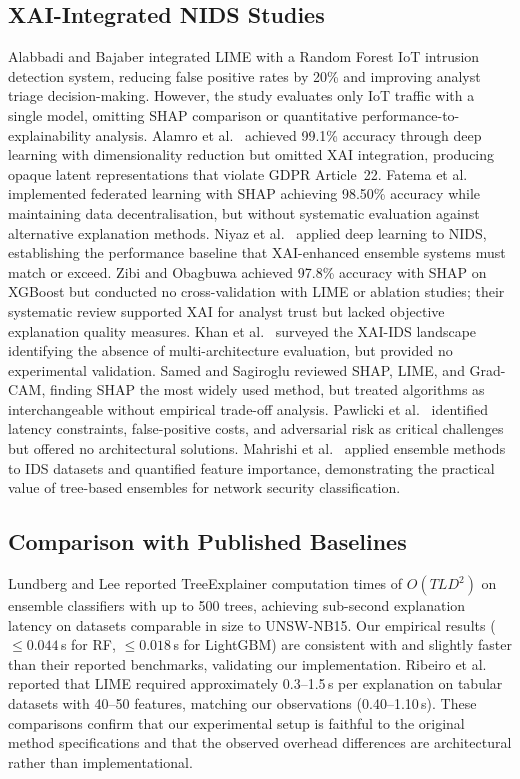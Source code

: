 \documentclass[conference]{IEEEtran}
\begin{document}
\subsection{XAI-Integrated NIDS Studies}

Alabbadi and Bajaber \cite{alabbadi2025} integrated LIME with a Random Forest IoT intrusion detection system, reducing false positive rates by 20\% and improving analyst triage decision-making. However, the study evaluates only IoT traffic with a single model, omitting SHAP comparison or quantitative performance-to-explainability analysis. Alamro et al.\ \cite{alamro2025} achieved 99.1\% accuracy through deep learning with dimensionality reduction but omitted XAI integration, producing opaque latent representations that violate GDPR Article~22. Fatema et al.\ \cite{fatema2025} implemented federated learning with SHAP achieving 98.50\% accuracy while maintaining data decentralisation, but without systematic evaluation against alternative explanation methods. Niyaz et al.\ \cite{niyaz2016} applied deep learning to NIDS, establishing the performance baseline that XAI-enhanced ensemble systems must match or exceed. Zibi and Obagbuwa \cite{zibi2025b} achieved 97.8\% accuracy with SHAP on XGBoost but conducted no cross-validation with LIME or ablation studies; their systematic review \cite{zibi2025a} supported XAI for analyst trust but lacked objective explanation quality measures. Khan et al.\ \cite{khan2025} surveyed the XAI-IDS landscape identifying the absence of multi-architecture evaluation, but provided no experimental validation. Samed and Sagiroglu \cite{samed2025} reviewed SHAP, LIME, and Grad-CAM, finding SHAP the most widely used method, but treated algorithms as interchangeable without empirical trade-off analysis. Pawlicki et al.\ \cite{pawlicki2024} identified latency constraints, false-positive costs, and adversarial risk as critical challenges but offered no architectural solutions. Mahrishi et al.\ \cite{mahrishi2021} applied ensemble methods to IDS datasets and quantified feature importance, demonstrating the practical value of tree-based ensembles for network security classification.

\subsection{Comparison with Published Baselines}

Lundberg and Lee \cite{lundberg2017} reported TreeExplainer computation times of $O(TLD^2)$ on ensemble classifiers with up to 500 trees, achieving sub-second explanation latency on datasets comparable in size to UNSW-NB15. Our empirical results ($\leq 0.044$\,s for RF, $\leq 0.018$\,s for LightGBM) are consistent with and slightly faster than their reported benchmarks, validating our implementation. Ribeiro et al.\ \cite{ribeiro2016} reported that LIME required approximately 0.3--1.5\,s per explanation on tabular datasets with 40--50 features, matching our observations (0.40--1.10\,s). These comparisons confirm that our experimental setup is faithful to the original method specifications and that the observed overhead differences are architectural rather than implementational.
\end{document}
